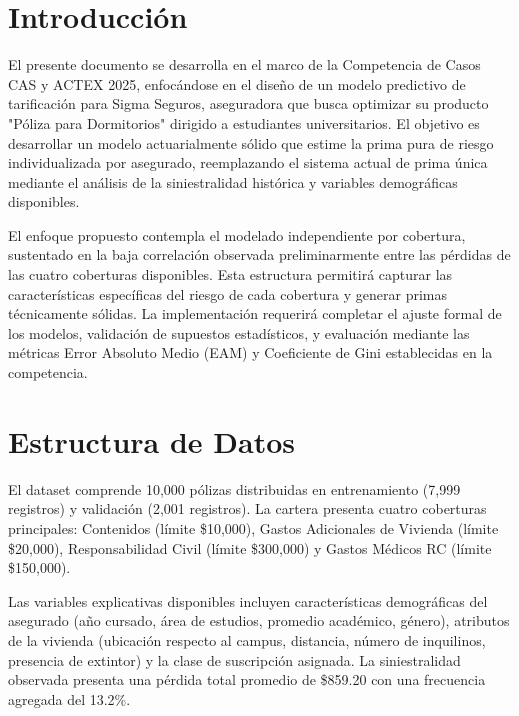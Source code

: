 \documentclass{article}
\date{\today}
\begin{document}
\thispagestyle{firstpage}
\vspace*{8\baselineskip}
\graphicspath{ {./figures/} }

\renewcommand{\contentsname}{}
\begin{cuadrocontenido}
  \tableofcontents
\end{cuadrocontenido}

\section{Introducción}

El presente documento se desarrolla en el marco de la Competencia de Casos CAS y ACTEX 2025, enfocándose en el diseño de un modelo predictivo de tarificación para Sigma Seguros, aseguradora que busca optimizar su producto "Póliza para Dormitorios" dirigido a estudiantes universitarios. El objetivo es desarrollar un modelo actuarialmente sólido que estime la prima pura de riesgo individualizada por asegurado, reemplazando el sistema actual de prima única mediante el análisis de la siniestralidad histórica y variables demográficas disponibles.

\medskip

El enfoque propuesto contempla el modelado independiente por cobertura, sustentado en la baja correlación observada preliminarmente entre las pérdidas de las cuatro coberturas disponibles. Esta estructura permitirá capturar las características específicas del riesgo de cada cobertura y generar primas técnicamente sólidas. La implementación requerirá completar el ajuste formal de los modelos, validación de supuestos estadísticos, y evaluación mediante las métricas Error Absoluto Medio (EAM) y Coeficiente de Gini establecidas en la competencia.

\section{Estructura de Datos}

El dataset comprende 10,000 pólizas distribuidas en entrenamiento (7,999 registros) y validación (2,001 registros). La cartera presenta cuatro coberturas principales: Contenidos (límite \$10,000), Gastos Adicionales de Vivienda (límite \$20,000), Responsabilidad Civil (límite \$300,000) y Gastos Médicos RC (límite \$150,000).

\medskip

Las variables explicativas disponibles incluyen características demográficas del asegurado (año cursado, área de estudios, promedio académico, género), atributos de la vivienda (ubicación respecto al campus, distancia, número de inquilinos, presencia de extintor) y la clase de suscripción asignada. La siniestralidad observada presenta una pérdida total promedio de \$859.20 con una frecuencia agregada del 13.2\%.
\end{document}
